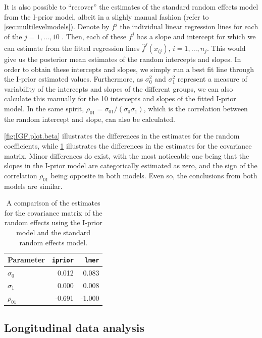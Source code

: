 \documentclass[showframe,11pt,twoside,openright]{report}\usepackage[]{graphicx}\usepackage{xcolor}
\begin{document}
It is also possible to ``recover'' the estimates of the standard random effects model from the I-prior model, albeit in a slighly manual fashion (refer to \cref{sec:multilevelmodels}).
Denote by $f^j$ the individual linear regression lines for each of the $j=1,\dots,10$ .
Then, each of these $f^j$ has a slope and intercept for which we can estimate from the fitted regression lines $\hat f^j(x_{ij})$, $i=1,\dots,n_j$.
This would give us the posterior mean estimates of the random intercepts and slopes.
In order to obtain these intercepts and slopes, we simply run a best fit line through the I-prior estimated  values.
Furthermore, as $\sigma_0^2$ and $\sigma_1^2$ represent a measure of variability of the intercepts and slopes of the different groups, we can also calculate this manually for the 10 intercepts and slopes of the fitted I-prior model.
In the same spirit, $\rho_{01} = \sigma_{01} / (\sigma_0 \sigma_1)$, which is the correlation between the random intercept and slope, can also be calculated.

\cref{fig:IGF.plot.beta} illustrates the differences in the estimates for the random coefficients, while  \cref{tab:igf} illustrates the differences in the estimates for the covariance matrix.
Minor differences do exist, with the most noticeable one being that the slopes in the I-prior model are categorically estimated as zero, and the sign of the correlation $\rho_{01}$ being opposite in both models.
Even so, the conclusions from both models are similar.

\begin{table}[htb]
\centering
\caption[A comparison of the estimates for the IGF data set]{A comparison of the estimates for the covariance matrix of the random effects using the I-prior model and the standard random effects model.}
\label{tab:igf}
\begin{tabular}{lrr}
\toprule
Parameter     & \texttt{iprior} & \texttt{lmer} \\
\midrule
$\sigma_0$    & 0.012 & 0.083 \\
$\sigma_1$    & 0.000 & 0.008 \\
$\rho_{01}$   & -0.691& -1.000 \\
\bottomrule
\end{tabular}
\end{table}

\subsection{Longitudinal data analysis}
\label{sec:cows}
\end{document}
